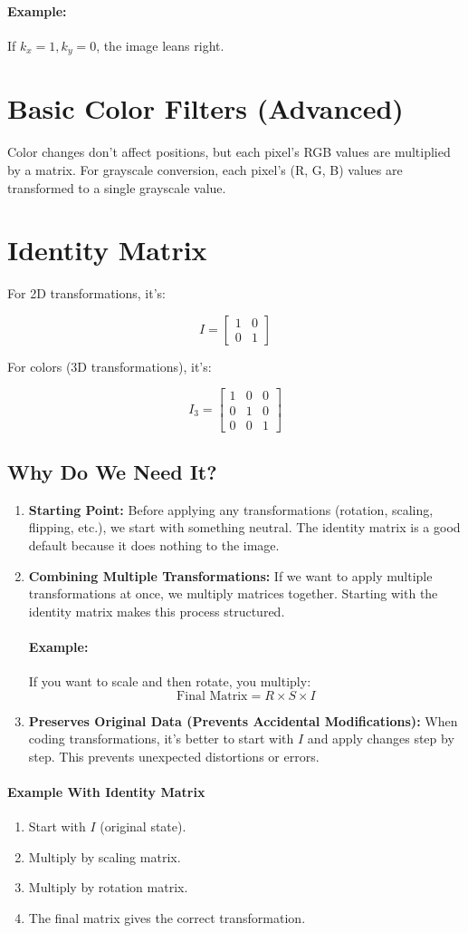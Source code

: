 \documentclass{article}
\begin{document}
\paragraph{Example:} If \(k_x = 1, k_y = 0\), the image leans right.

\section{Basic Color Filters (Advanced)}
Color changes don’t affect positions, but each pixel’s RGB values are multiplied by a matrix. For grayscale conversion, each pixel’s (R, G, B) values are transformed to a single grayscale value.

\section{Identity Matrix}
For 2D transformations, it's:

\[
I = \begin{bmatrix}
1 & 0 \\
0 & 1
\end{bmatrix}
\]

For colors (3D transformations), it's:

\[
I_3 = \begin{bmatrix}
1 & 0 & 0 \\
0 & 1 & 0 \\
0 & 0 & 1
\end{bmatrix}
\]

\subsection{Why Do We Need It?}
\begin{enumerate}
    \item \textbf{Starting Point:} Before applying any transformations (rotation, scaling, flipping, etc.), we start with something neutral. The identity matrix is a good default because it does nothing to the image.
    \item \textbf{Combining Multiple Transformations:} If we want to apply multiple transformations at once, we multiply matrices together. Starting with the identity matrix makes this process structured. 

    \paragraph{Example:} If you want to scale and then rotate, you multiply:
    \[
    \text{Final Matrix} = R \times S \times I
    \]

    \item \textbf{Preserves Original Data (Prevents Accidental Modifications):} When coding transformations, it's better to start with \(I\) and apply changes step by step. This prevents unexpected distortions or errors.
\end{enumerate}

\paragraph{Example With Identity Matrix}
\begin{enumerate}
    \item Start with \(I\) (original state).
    \item Multiply by scaling matrix.
    \item Multiply by rotation matrix.
    \item The final matrix gives the correct transformation.
\end{enumerate}
\end{document}

